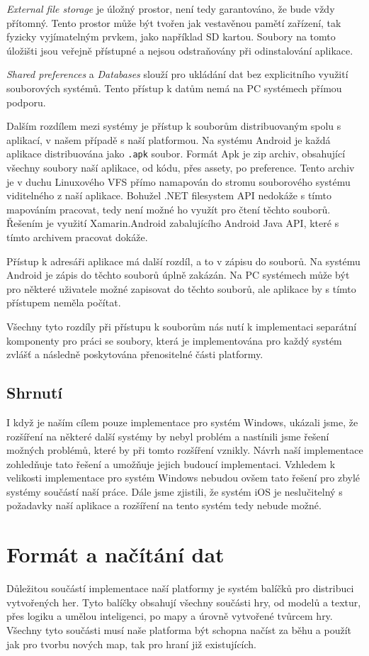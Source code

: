 \textit{External file storage} je   úložný prostor, není tedy garantováno, že bude vždy přítomný. Tento prostor může být tvořen jak vestavěnou pamětí zařízení, tak fyzicky vyjímatelným prvkem, jako například SD kartou. Soubory na tomto úložišti jsou veřejně přístupné a nejsou odstraňovány při odinstalování aplikace. 

\textit{Shared preferences} a \textit{Databases} slouží pro ukládání dat bez explicitního využití souborových systémů. Tento přístup k datům nemá na PC systémech přímou podporu.


Dalším rozdílem mezi systémy je přístup k souborům distribuovaným spolu s aplikací, v našem případě s naší platformou. Na systému Android je každá aplikace distribuována jako \texttt{.apk} soubor. Formát Apk je zip archiv, obsahující všechny soubory naší aplikace, od kódu, přes assety, po preference. Tento archiv je v duchu Linuxového VFS přímo namapován do stromu souborového systému viditelného z naší aplikace. Bohužel .NET filesystem API nedokáže s tímto mapováním pracovat, tedy není možné ho využít pro čtení těchto souborů. Řešením je využití Xamarin.Android zabalujícího Android Java API, které s tímto archivem pracovat dokáže.

Přístup k adresáři aplikace má další rozdíl, a to v zápisu do souborů. Na systému Android je zápis do těchto souborů úplně zakázán. Na PC systémech může být pro některé uživatele možné zapisovat do těchto souborů, ale aplikace by s tímto přístupem neměla počítat.

Všechny tyto rozdíly při přístupu k souborům nás nutí k implementaci separátní komponenty pro práci se soubory, která je implementována pro každý systém zvlášť a následně poskytována přenositelné části platformy.

\subsection{Shrnutí}
I když je naším cílem pouze implementace pro systém Windows, ukázali jsme, že rozšíření na některé další systémy by nebyl problém a nastínili jsme řešení možných problémů, které by při tomto rozšíření vznikly. Návrh naší implementace zohledňuje tato řešení a umožňuje jejich  budoucí implementaci. Vzhledem k velikosti implementace pro systém Windows nebudou ovšem tato řešení pro zbylé systémy součástí naší práce. Dále jsme zjistili, že systém iOS je neslučitelný s požadavky naší aplikace a rozšíření na tento systém tedy nebude možné.

\section{Formát a načítání dat}
Důležitou součástí implementace naší platformy je systém balíčků pro distribuci vytvořených her. Tyto balíčky obsahují všechny součásti hry, od modelů a textur, přes logiku a umělou inteligenci, po mapy a úrovně vytvořené tvůrcem hry. Všechny tyto součásti musí naše platforma být schopna načíst za běhu a použít jak pro tvorbu nových map, tak pro hraní již existujících.

